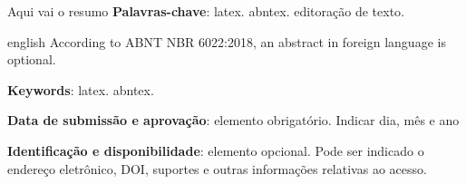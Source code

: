 \documentclass[article, 11pt, oneside, a4paper, english, brazil, sumario=tradicional]{abntex2}
\begin{document}

\frenchspacing

\maketitle
\begin{resumoumacoluna}
  Aqui vai o resumo
 \vspace{\onelineskip}
 \noindent
 \textbf{Palavras-chave}: latex. abntex. editoração de texto.
\end{resumoumacoluna}

\renewcommand{\resumoname}{Abstract}
\begin{resumoumacoluna}
 \begin{otherlanguage*}{english}
   According to ABNT NBR 6022:2018, an abstract in foreign language is optional.

   \vspace{\onelineskip}

   \noindent
   \textbf{Keywords}: latex. abntex.
 \end{otherlanguage*}
\end{resumoumacoluna}
\begin{center}\smaller
\textbf{Data de submissão e aprovação}: elemento obrigatório. Indicar dia, mês e ano

\textbf{Identificação e disponibilidade}: elemento opcional. Pode ser indicado
o endereço eletrônico, DOI, suportes e outras informações relativas ao acesso.
\end{center}

\tableofcontents*
\cleardoublepage

\textual
\end{document}
